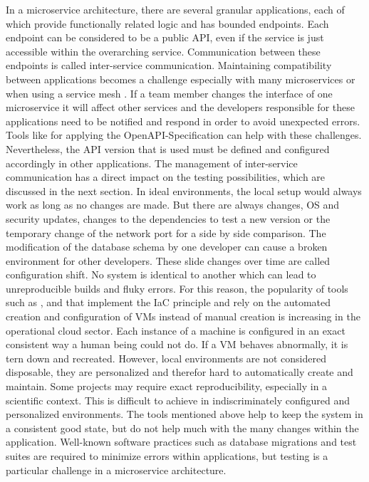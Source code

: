 \documentclass[12pt, a4paper]{article}
\begin{document}
        In a microservice architecture, there are several granular applications, each of which provide functionally related logic and has bounded endpoints. Each endpoint can be considered to be a public \ac{API}, even if the service is just accessible within the overarching service. Communication between these endpoints is called inter-service communication. Maintaining compatibility between applications becomes a challenge especially with many microservices or when using a service mesh \cite{micro}. If a team member changes the interface of one microservice it will affect other services and the developers responsible for these applications need to be notified and respond in order to avoid unexpected errors. Tools like  for applying the OpenAPI-Specification can help with these challenges. Nevertheless, the \ac{API} version that is used must be defined and configured accordingly in other applications. The management of inter-service communication has a direct impact on the testing possibilities, which are discussed in the next section.\newline
        In ideal environments, the local setup would always work as long as no changes are made. But there are always changes, \ac{OS} and security updates, changes to the dependencies to test a new version or the temporary change of the network port for a side by side comparison. The modification of the database schema by one developer can cause a broken environment for other developers. These slide changes over time are called configuration shift. No system is identical to another which can lead to unreproducible builds and fluky errors. For this reason, the popularity of tools such as ,  and  that implement the \ac{IaC} principle and rely on the automated creation and configuration of \ac{VM}s instead of manual creation is increasing in the operational cloud sector. Each instance of a machine is configured in an exact consistent way a human being could not do. If a \ac{VM} behaves abnormally, it is tern down and recreated. However, local environments are not considered disposable, they are personalized and therefor hard to automatically create and maintain. Some projects may require exact reproducibility, especially in a scientific context. This is difficult to achieve in indiscriminately configured and personalized environments.\newline
        The tools mentioned above help to keep the system in a consistent good state, but do not help much with the many changes within the application. Well-known software practices such as database migrations and test suites are required to minimize errors within applications, but testing is a particular challenge in a microservice architecture.
\end{document}
